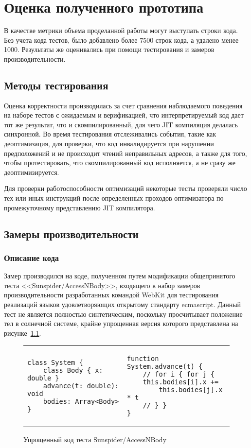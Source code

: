 \documentclass[times
]{itmo-student-thesis}
\begin{document}
\chapter{Оценка полученного прототипа}\label{ch:results}
В качестве метрики объема проделанной работы могут выступать строки кода. Без учета кода тестов, было добавлено более 7500 строк кода, а удалено менее 1000. Результаты же оценивались при помощи тестирования и замеров производительности.

\section{Методы тестирования}
Оценка корректности производилась за счет сравнения наблюдаемого поведения на наборе тестов с ожидаемым и верификацией, что интерпретируемый код дает тот же результат, что и скомпилированный, для чего JIT компиляция делалась синхронной. Во время тестирования отслеживались события, такие как деоптимизация, для проверки, что код инвалидируется при нарушении предположений и не происходит чтений неправильных адресов, а также для того, чтобы протестировать, что скомпилированный код исполняется, а не сразу же деоптимизируется.

Для проверки работоспособности оптимизаций некоторые тесты проверяли число тех или иных инструкций после определенных проходов оптимизатора по промежуточному представлению JIT компилятора.

\section{Замеры производительности}\label{sec:sunspider}
\subsection{Описание кода}
Замер производился на коде, полученном путем модификации общепринятого теста <<Sunspider/AccessNBody>>, входящего в набор замеров производительности разработанных командой WebKit для тестирования реализаций языков удовлетворяющих открытому стандарту ecmascript. Данный тест не является полностью синтетическим, поскольку просчитывает положение тел в солнечной системе, крайне упрощенная версия которого представлена на рисунке~\ref{bench-access-code}.

\begin{figure}
\centering
\caption{Упрощенный код теста Sunspider/AccessNBody}\label{bench-access-code}
\begin{tabular}[t]{p{}|p{}}
\begin{lstlisting}
class System {
	class Body { x: double }
	advance(t: double): void
	bodies: Array<Body>
}
\end{lstlisting} &
\begin{lstlisting}
function System.advance(t) {
	// for i { for j {
	this.bodies[i].x +=
		this.bodies[j].x * t
	// } }
}
\end{lstlisting}
\end{tabular}
\end{figure}
\end{document}
